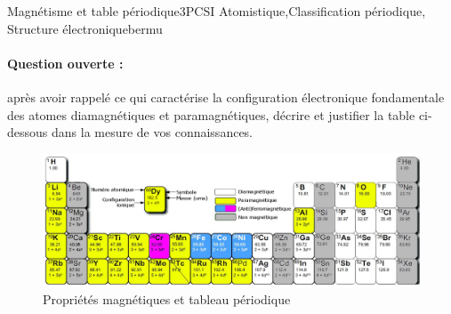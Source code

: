 
\begin{exercise}{Magnétisme et table périodique}{3}{PCSI}
{Atomistique,Classification périodique, Structure électronique}{bermu}

\paragraph{Question ouverte :} après avoir rappelé ce qui caractérise la configuration électronique fondamentale des atomes diamagnétiques et paramagnétiques, décrire et justifier la table ci-dessous dans la mesure de vos connaissances.


    \begin{figure}[H]
        \centering
        \includegraphics[width=\linewidth]{chimiePC/atomes/magnet.png}
        \caption{Propriétés magnétiques et tableau périodique}
    \end{figure}

\end{exercise}